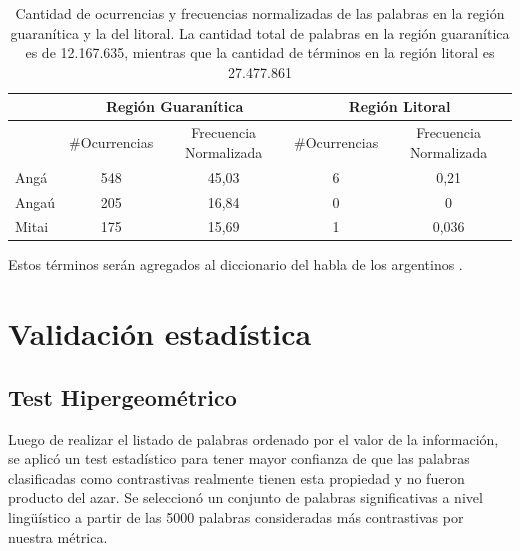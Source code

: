 \begin{table}
\centering

\begin{tabular}{|l|cc|cc|}
\hline
 & \multicolumn{2}{c}{Región Guaranítica} & \multicolumn{2}{c}{Región Litoral} \\ \hline
      & \#Ocurrencias & Frecuencia Normalizada & \#Ocurrencias & Frecuencia Normalizada \\
Angá  & 548              & 45,03       & 6             & 0,21                  \\
Angaú & 205               & 16,84   & 0               & 0                     \\
Mitai & 175              & 15,69      & 1              & 0,036    \\ \hline              
\end{tabular}

\caption{Cantidad de ocurrencias y frecuencias normalizadas de las palabras en la región guaranítica y la del litoral. La cantidad total de palabras en la región guaranítica es de 12.167.635, mientras que la cantidad de términos en la región litoral es 27.477.861 }
\label{tab:guaranismos}
\end{table}

Estos términos serán agregados al diccionario del habla de los argentinos \cite{academia2008diccionario}.


\section{Validación estadística}
\subsection{Test Hipergeométrico}
Luego de realizar el listado de palabras ordenado por el valor de la información, se aplicó un test estadístico para tener mayor confianza de que las palabras clasificadas como contrastivas realmente tienen esta propiedad y no fueron producto del azar. Se seleccionó un conjunto de palabras significativas a nivel lingüístico a partir de las 5000 palabras consideradas más contrastivas por nuestra métrica. 


